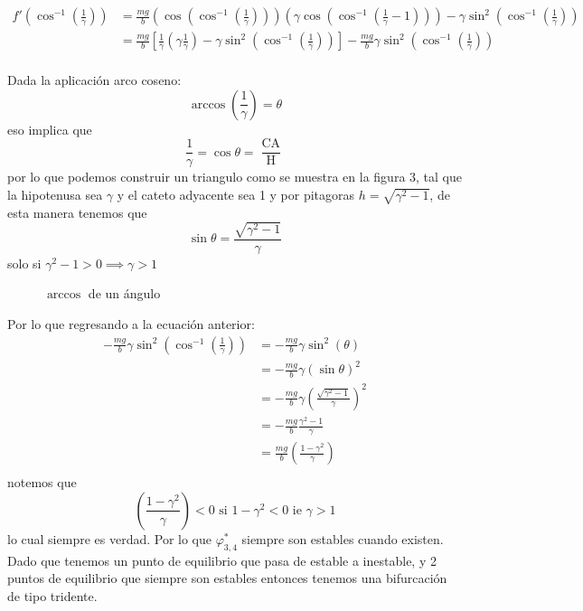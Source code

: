 $$
\begin{aligned}
  f' \left( \cos^{-1} \left( \frac{1}{\gamma} \right)  \right)&=\frac{mg}{b} \left( \cos \left( \cos^{-1} \left( \frac{1}{\gamma} \right)  \right) \right) \left( \gamma\cos \left( \cos^{-1} \left( \frac{1}{\gamma} -1 \right)  \right)  \right) - \gamma\sin^2 \left( \cos^{-1} \left( \frac{1}{\gamma} \right)  \right)  \\
&= \frac{mg}{b} \left[ \frac{1}{\gamma} \left( \gamma \frac{1}{\gamma} \right) - \gamma\sin^2 \left( \cos^{-1} \left( \frac{1}{\gamma} \right)  \right)   \right] - \frac{mg}{b} \gamma \sin^2 \left( \cos^{-1} \left( \frac{1}{\gamma} \right)  \right)   \\ 
\end{aligned}
$$
\begin{tcolorbox}[colback=Black!4,colframe=White] 
\begin{nota}
Dada la aplicación arco coseno:
  $$
\operatorname{arccos} \left( \frac{1}{\gamma} \right)= \theta 
$$
eso implica que  $$
\frac{1}{\gamma}=\cos\theta = \frac{\operatorname{CA}}{\operatorname{H}}
$$
por lo que podemos construir un triangulo como se muestra en la figura 3, tal que la hipotenusa sea $\gamma$ y el cateto adyacente sea 1 y por pitagoras $h=\sqrt{\gamma^2-1}$, de esta manera tenemos que
$$
\sin\theta= \frac{\sqrt{\gamma^2-1}}{\gamma}
$$
solo si $\gamma^2-1>0 \implies \gamma>1$
\end{nota}
\end{tcolorbox}

\begin{figure}[ht]
    \centering
    \caption{$\operatorname{arccos}$ de un ángulo}
    \label{fig:triangulo}
\end{figure}

Por lo que regresando a la ecuación anterior:
$$
\begin{aligned}
  -\frac{mg}{b}\gamma\sin^2 \left( \cos^{-1} \left( \frac{1}{\gamma} \right)  \right) &= -\frac{mg}{b}\gamma\sin^2(\theta) \\
  &= -\frac{mg}{b}\gamma(\sin\theta)^2 \\ 
  &= -\frac{mg}{b}\gamma \left( \frac{ \sqrt{\gamma^2 - 1}}{\gamma} \right)^2  \\
  &= -\frac{mg}{b}\frac{\gamma^2-1}{\gamma} \\
  &= \frac{mg}{b} \left( \frac{1-\gamma^2}{\gamma}  \right) \\ 
\end{aligned}
$$
notemos que $$
\left( \frac{1-\gamma^2}{\gamma} \right)<0 \text{ si } 1-\gamma^2<0 \text{ ie } \gamma>1 
$$
lo cual siempre es verdad. Por lo que $\varphi^{*}_{3,4}$ siempre son estables cuando existen. Dado que tenemos un punto de equilibrio que pasa de estable a inestable, y 2 puntos de equilibrio que siempre son estables entonces tenemos una bifurcación de tipo tridente.




